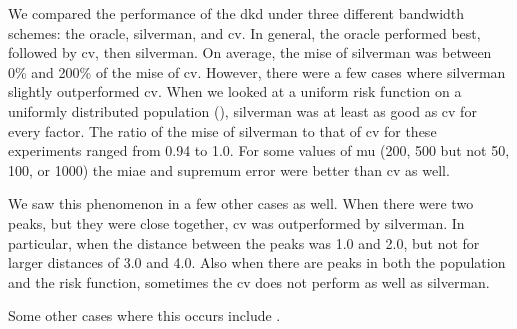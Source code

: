 


We compared the performance of the \gls{dkd} under three different bandwidth schemes:
the \gls{oracle}, \gls{silverman}, and \gls{cv}.
In general, the \gls{oracle} performed best, followed by \gls{cv}, then \gls{silverman}.
On average, the \gls{mise} of \gls{silverman} was between 0\% and 200\% of the \gls{mise} of \gls{cv}.
However, there were a few cases where \gls{silverman} slightly outperformed \gls{cv}.
When we looked at a uniform risk function on a uniformly distributed population (), \gls{silverman} was at least as good as \gls{cv} for every \gls{factor}.
The ratio of the \gls{mise} of \gls{silverman} to that of \gls{cv} for these experiments ranged from 0.94 to 1.0.
For some values of \gls{mu} (200, 500 but not 50, 100, or 1000) the \gls{miae} and \gls{supremum error} were better than \gls{cv} as well.

We saw this phenomenon in a few other cases as well.
When there were two peaks, but they were close together, \gls{cv} was outperformed by \gls{silverman}.
In particular, when the distance between the peaks was 1.0 and 2.0, but not for larger distances of 3.0 and 4.0.
Also when there are peaks in both the population and the risk function, sometimes the \gls{cv} does not perform as well as \gls{silverman}.

Some other cases where this occurs include .